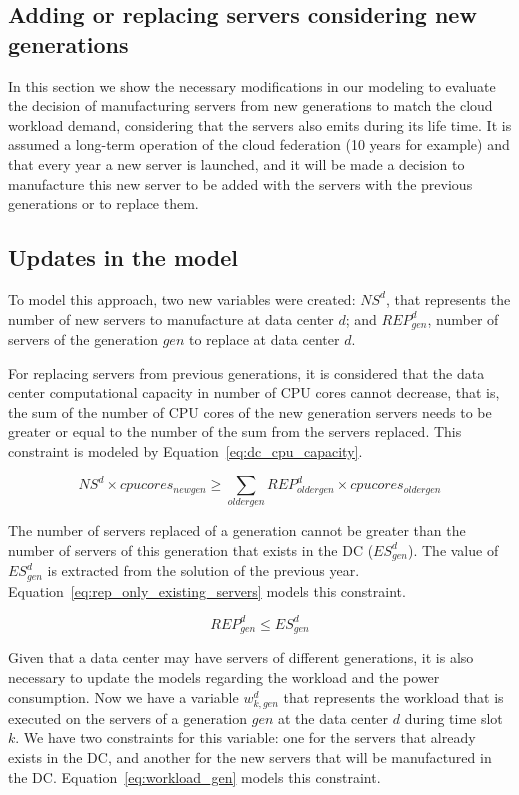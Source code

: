\subsection{Adding or replacing servers considering new generations }

In this section we show the necessary modifications in our modeling to evaluate the decision of manufacturing servers from new generations to match the cloud workload demand, considering that the servers also emits  during its life time. It is assumed a long-term operation of the cloud federation (10 years for example) and that every year a new server is launched, and it will be made a decision to manufacture this new server to be added with the servers with the previous generations or to replace them.

\subsection{Updates in the model}

To model this approach, two new variables were created: $NS^d$, that represents the number of new servers to manufacture at data center $d$; and $REP_{gen}^d$, number of servers of the generation $gen$ to replace at data center $d$.

For replacing servers from previous generations, it is considered that the data center computational capacity in number of CPU cores cannot decrease, that is, the sum of the number of CPU cores of the new generation servers needs to be greater or equal to the number of the sum from the servers replaced. This constraint is modeled by Equation~\eqref{eq:dc_cpu_capacity}.

\begin{equation} \label{eq:dc_cpu_capacity}
 NS^d \times cpucores_{newgen} \geq \sum_{oldergen}  REP_{oldergen}^d \times cpucores_{oldergen}
\end{equation}

The number of servers replaced of a generation cannot be greater than the number of servers of this generation that exists in the DC ($ES_{gen}^d $). The value of  $ES_{gen}^d $ is extracted from the solution of the previous year. Equation~\eqref{eq:rep_only_existing_servers} models this constraint.

\begin{equation} \label{eq:rep_only_existing_servers}
 REP_{gen}^d \leq ES_{gen}^d 
\end{equation}


Given that a data center may have servers of different generations, it is also necessary to update the models regarding the workload and the power consumption. Now we have a variable $w_{k,gen}^d$ that represents the workload that is executed on the servers of a generation $gen$ at the data center $d$ during time slot $k$. We have two constraints for this variable: one for the servers that already exists in the DC, and another for the new servers that will be manufactured in the DC. Equation~\eqref{eq:workload_gen} models this constraint.


